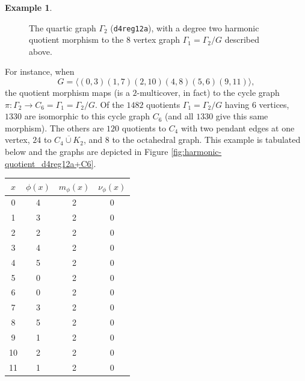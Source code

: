 \documentclass[12pt,letterpaper]{article}
\theoremstyle{definition}
\newtheorem{example}[theorem]{Example}
\begin{document}
\begin{example}
{\begin{figure}[H]
\begin{minipage}{\textwidth}
\begin{center}
%
\end{center}
\end{minipage}
\caption{The quartic graph $\Gamma_2$ ({\tt d4reg12a}), with a degree two harmonic quotient morphism to the $8$ vertex graph $\Gamma_1=\Gamma_2/G$ described above.}
\label{fig:harmonic-quotient_d4reg12a+v8e12ds44442222}
\end{figure}

For instance, when
\[
G = \langle (0,3)(1,7)(2,10)(4,8)(5,6)(9,11) \rangle ,
\]
the quotient morphism maps (is a $2$-multicover, in fact) to the cycle graph
$\pi: \Gamma_2\to C_6=\Gamma_1=\Gamma_2/G $.
Of the $1482$ quotients $\Gamma_1=\Gamma_2/G$ having $6$ vertices,
$1330$ are isomorphic to this cycle graph $C_6$ (and all $1330$ give this
same morphism). The others are $120$ quotients to $C_4$ with two pendant
edges at one vertex, $24$ to $\overline{C_4\cup K_2}$, and $8$ to the
octahedral graph.
This example
is tabulated below and the graphs are depicted in
Figure \ref{fig:harmonic-quotient_d4reg12a+C6}. 

\begin{center}
\begin{tabular}{c|c|c|c}  
  $x$ & $\phi(x)$ & $m_\phi(x)$ & $\nu_\phi(x)$ \\ \hline
  0   &    4   &        2         &  0   \\ 
  1   &    3   &        2         &  0  \\ 
  2   &    2   &        2         &  0  \\ 
  3   &    4   &        2         &  0  \\ 
  4   &    5   &        2         &  0   \\
  5   &    0   &        2         &  0   \\
  6   &    0   &        2         &  0   \\
  7   &    3   &        2         &  0   \\
  8   &    5   &        2         &  0   \\
  9   &    1   &        2         &  0   \\
  10   &   2   &        2         &  0  \\   
  11   &   1   &        2         &  0  \\
\end{tabular}
\end{center}

}
\end{example}
\end{document}
